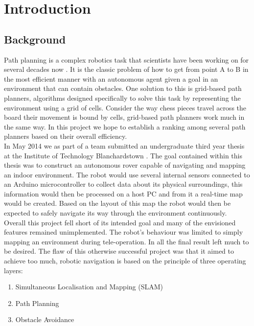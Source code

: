 \chapter{Introduction}


\section{Background}

\noindent
Path planning is a complex robotics task that scientists have been working on for several decades now \cite{DIJKSTRA, D*}. It is the classic problem of how to get from point A to B in the most efficient manner with an autonomous agent given a goal in an environment that can contain obstacles. One solution to this is grid-based path planners, algorithms designed specifically to solve this task by representing the environment using a grid of cells. Consider the way chess pieces travel across the board their movement is bound by cells, grid-based path planners work much in the same way. In this project we hope to establish a ranking among several path planners based on their overall efficiency. \\ 

\noindent
In May 2014 we as part of a team submitted an undergraduate third year thesis at the Institute of Technology Blanchardstown \cite{JMD14}. The goal contained within this thesis was to construct an autonomous rover capable of navigating and mapping an indoor environment. The robot would use several internal sensors connected to an Arduino microcontroller to collect data about its physical surroundings, this information would then be processed on a host PC and from it a real-time map would be created. Based on the layout of this map the robot would then be expected to safely navigate its way through the environment continuously. \\

\noindent
Overall this project fell short of its intended goal and many of the envisioned features remained unimplemented. The robot's behaviour was limited to simply mapping an environment during tele-operation. In all the final result left much to be desired. The flaw of this otherwise successful project was that it aimed to achieve too much, robotic navigation is based on the principle of three operating layers: 

\begin{enumerate}
\item Simultaneous Localisation and Mapping (SLAM)
\item Path Planning
\item Obstacle Avoidance
\end{enumerate}


